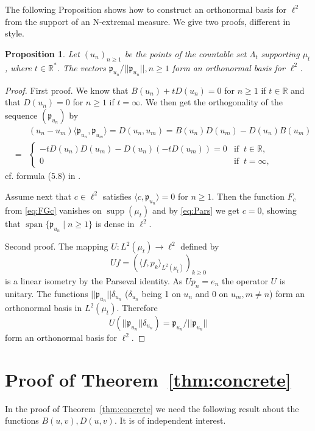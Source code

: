 \documentclass [12pt]{article}
\DeclareMathOperator{\spn}{span}
\newtheorem{prop}[thm]{Proposition}
\DeclareMathOperator{\supp}{supp}
\newcommand{\R}{\mathbb{R}}
\begin{document}
The following Proposition shows how to construct an orthonormal basis for $\ell^2$ from the support of an N-extremal measure. We give two proofs, different in style. 
 
\begin{prop}\label{thm:ONB} Let $(u_n)_{n\ge 1}$ be the points of the countable set $\Lambda_t$ supporting $\mu_t$, where $t\in\R^*$. The vectors $\mathfrak{p}_{u_n}/||\mathfrak{p}_{u_n}||, n\ge 1$ form an orthonormal basis for $\ell^2$.
\end{prop}

\begin{proof} First proof. We know that $B(u_n)+tD(u_n)=0$ for $n\ge 1$ if $t\in\R$ and that $D(u_n)=0$ for $n\ge 1$ if $t=\infty$. We then get the orthogonality of the sequence $(\mathfrak{p}_{u_n})$ by
\begin{eqnarray*}
&&(u_n-u_m)\langle \mathfrak{p}_{u_n}, \mathfrak{p}_{u_m}\rangle=D(u_n, u_m)
=B(u_n)D(u_m)-D(u_n)B(u_m)\\
&=&\left\{\begin{array}{ll}
 -tD(u_n)D(u_m)-D(u_n)(-tD(u_m))=0 & \mbox{if} \;\; t\in\R,\\
 0 & \mbox{if}\;\; t=\infty,
 \end{array}
  \right.
\end{eqnarray*}
cf. formula (5.8) in \cite{B:S5}.

Assume next that $c\in\ell^2$ satisfies $\langle c, \mathfrak{p}_{u_n}\rangle=0$ for $n\ge 1$. Then the function $F_c$ from \eqref{eq:FGc} vanishes on $\supp(\mu_t)$ and by \eqref{eq:Pars} we get $c=0$, showing that  $\spn\{\mathfrak{p}_{u_n}\mid n\ge 1\}$ is  dense in $\ell^2$.

Second proof. The mapping $U:L^2(\mu_t)\to \ell^2$ defined by
$$
Uf=\left(\langle f, p_k \rangle_{L^2(\mu_t)}\right)_{k\ge 0}
$$
is a linear isometry by the Parseval identity. As $Up_n=e_n$ the operator  $U$ is unitary.
The functions $||\mathfrak{p}_{u_n}||\delta_{u_n}$ ($\delta_{u_n}$ being 1 on $u_n$ and  0 on $u_m, m\neq n$) form an orthonormal basis in $L^2(\mu_t)$. Therefore
$$
U(||\mathfrak{p}_{u_n}||\delta_{u_n})=\mathfrak{p}_{u_n}/||\mathfrak{p}_{u_n}||
$$
form an orthonormal basis for $\ell^2$.
\end{proof}

 
\section{Proof of Theorem~\ref{thm:concrete}}
 In the proof of Theorem~\ref{thm:concrete} we need the following result about the functions $B(u,v), D(u,v)$. It is  of independent interest.
\end{document}
